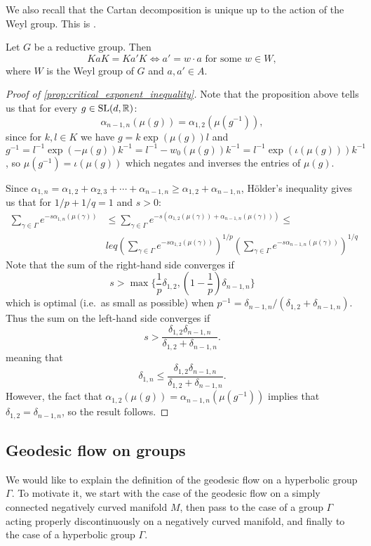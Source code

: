 \documentclass{report}
\begin{document}
We also recall that the Cartan decomposition is unique up to the action of the Weyl group. This is \cite[Proposition 7.39]{knapp1996lie}.
\begin{proposition}
    Let $G$ be a reductive group.
    Then 
    \[
    K a K = K a' K \iff a' = w \cdot a \text{ for some } w \in W,
    \]
    where $W$ is the Weyl group of $G$ and $a, a' \in A$.
\end{proposition}

\begin{proof}[Proof of \cref{prop:critical_exponent_inequality}]
    Note that the proposition above tells us that for every $g \in \operatorname{{\mathrm{SL}}}(d,\mathbb R)$:
    \[
    \alpha_{n-1,n}(\mu(g)) = \alpha_{1,2}(\mu(g^{-1})),
    \]
    since for $k,l \in K$ we have $g = k \exp(\mu(g)) l$ and 
    $$g^{-1} = l^{-1} \exp(-\mu(g)) k^{-1} = l^{-1} -w_0(\mu(g)) k^{-1} = l^{-1} \exp(\iota(\mu(g))) k^{-1}$$, so $\mu(g^{-1}) = \iota(\mu(g))$ which negates and inverses the entries of $\mu(g)$.

    Since $\alpha_{1,n} = \alpha_{1,2} + \alpha_{2,3} + \cdots + \alpha_{n-1,n} \geq \alpha_{1,2}+ \alpha_{n-1,n}$, Hölder's inequality gives us that for $1/p + 1/q = 1$ and $s > 0$:
    \begin{align*}
        \sum_{\gamma \in \Gamma} e^{-s \alpha_{1,n}(\mu(\gamma))} &\leq 
        \sum_{\gamma \in \Gamma} e^{-s (\alpha_{1,2}(\mu(\gamma)) + \alpha_{n-1,n}(\mu(\gamma)))}\leq\\
        &leq \left(\sum_{\gamma \in \Gamma} e^{-s \alpha_{1,2}(\mu(\gamma))}\right)^{1/p} \left(\sum_{\gamma \in \Gamma} e^{-s \alpha_{n-1,n}(\mu(\gamma))}\right)^{1/q}
    \end{align*}
    Note that the sum of the right-hand side converges if
    \[
    s > \max\{\frac{1}{p} \delta_{1,2}, \left(1 - \frac{1}{p}\right) \delta_{n-1,n}\}
    \]
    which is optimal (i.e.\ as small as possible) when $p^{-1} = \delta_{n-1,n }/(\delta_{1,2} + \delta_{n-1,n})$.
    Thus the sum on the left-hand side converges if
    \[
    s > \frac{\delta_{1,2} \delta_{n-1,n}}{\delta_{1,2} + \delta_{n-1,n}}.
    \]
    meaning that 
    \[
    \delta_{1,n} \leq \frac{\delta_{1,2} \delta_{n-1,n}}{\delta_{1,2} + \delta_{n-1,n}}.
    \]
    However, the fact that $\alpha_{1,2}(\mu(g)) = \alpha_{n-1,n}(\mu(g^{-1}))$ implies that $\delta_{1,2} = \delta_{n-1,n}$, so the result follows.
\end{proof}
\subsection{Geodesic flow on groups}
We would like to explain the definition of the geodesic flow on a hyperbolic group $\Gamma$.
To motivate it, we start with the case of the geodesic flow on a simply connected negatively curved manifold $M$, then pass to the case of a group $\Gamma$ acting properly discontinuously on a negatively curved manifold, and finally to the case of a hyperbolic group $\Gamma$.
\end{document}
